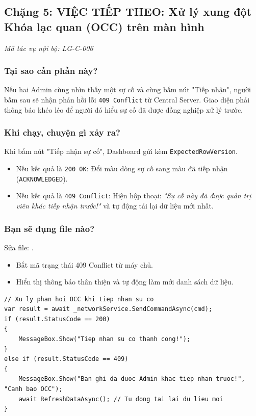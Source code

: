 \documentclass[12pt,a4paper]{article}
\begin{document}
\subsection{Chặng 5: VIỆC TIẾP THEO: Xử lý xung đột Khóa lạc quan (OCC) trên màn hình}
{\footnotesize\color{lgGray}\textit{Mã tác vụ nội bộ: LG-C-006}}\par
\vspace{2mm}

\subsubsection{Tại sao cần phần này?}
Nếu hai Admin cùng nhìn thấy một sự cố và cùng bấm nút "Tiếp nhận", người bấm sau sẽ nhận phản hồi lỗi \texttt{409 Conflict} từ Central Server. Giao diện phải thông báo khéo léo để người đó hiểu sự cố đã được đồng nghiệp xử lý trước.

\subsubsection{Khi chạy, chuyện gì xảy ra?}
Khi bấm nút "Tiếp nhận sự cố", Dashboard gửi kèm \texttt{ExpectedRowVersion}.
\begin{itemize}
  \item Nếu kết quả là \texttt{200 OK}: Đổi màu dòng sự cố sang màu đã tiếp nhận (\texttt{ACKNOWLEDGED}).
  \item Nếu kết quả là \texttt{409 Conflict}: Hiện hộp thoại: \textit{"Sự cố này đã được quản trị viên khác tiếp nhận trước!"} và tự động tải lại dữ liệu mới nhất.
\end{itemize}

\subsubsection{Bạn sẽ đụng file nào?}
Sửa file: .

\begin{orientationbox}
\begin{itemize}[leftmargin=1.5em, itemsep=1pt]
  \item Bắt mã trạng thái 409 Conflict từ máy chủ.
  \item Hiển thị thông báo thân thiện và tự động làm mới danh sách dữ liệu.
\end{itemize}
\end{orientationbox}

\begin{lstlisting}[language=CSharp, caption={Ví dụ rút gọn: Xử lý phản hồi 409 Conflict trên giao diện}]
// Xu ly phan hoi OCC khi tiep nhan su co
var result = await _networkService.SendCommandAsync(cmd);
if (result.StatusCode == 200)
{
    MessageBox.Show("Tiep nhan su co thanh cong!");
}
else if (result.StatusCode == 409)
{
    MessageBox.Show("Ban ghi da duoc Admin khac tiep nhan truoc!", "Canh bao OCC");
    await RefreshDataAsync(); // Tu dong tai lai du lieu moi
}
\end{lstlisting}
\end{document}
